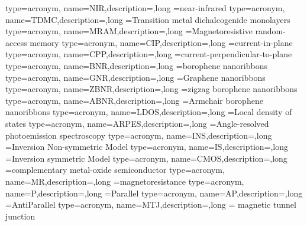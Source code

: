 {type=acronym, name={NIR},description={},long ={near-infrared}
}
{type=acronym, name={TDMC},description={},long ={Transition metal dichalcogenide monolayers}
}
{type=acronym, name={MRAM},description={},long ={Magnetoresistive random-access memory}
}
{type=acronym, name={CIP},description={},long ={current-in-plane}
}
{type=acronym, name={CPP},description={},long ={current-perpendicular-to-plane}
}
{type=acronym, name={BNR},description={},long ={borophene nanoribbons}
}
{type=acronym, name={GNR},description={},long ={Graphene nanoribbons}
}
{type=acronym, name={ZBNR},description={},long ={zigzag borophene nanoribbons}
}
{type=acronym, name={ABNR},description={},long ={Armchair borophene nanoribbons}
}
{type=acronym, name={LDOS},description={},long ={Local density of states}
}
{type=acronym, name={ARPES},description={},long ={Angle-resolved photoemission spectroscopy}
}
{type=acronym, name={INS},description={},long ={Inversion Non-symmetric Model}
}
{type=acronym, name={IS},description={},long ={Inversion symmetric Model}
}
{type=acronym, name={CMOS},description={},long ={complementary metal-oxide semiconductor}
}
{type=acronym, name={MR},description={},long ={magnetoresistance}
}
{type=acronym, name={P},description={},long ={Parallel}
}
{type=acronym, name={AP},description={},long ={AntiParallel}
}
{type=acronym, name={MTJ},description={},long ={ magnetic tunnel junction}
}
